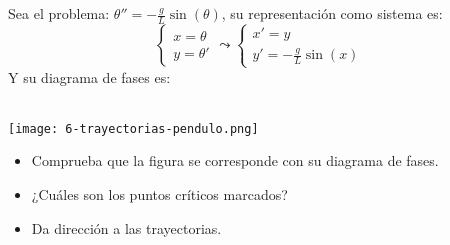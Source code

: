 \begin{th_ex}
    Sea el problema: $\theta '' = -\frac{g}{L} \sin(\theta)$, su representación como sistema es:
    $$
        \begin{cases}
            x = \theta\\
            y = \theta'
        \end{cases} \leadsto
        \begin{cases}
            x' = y\\
            y' = -\frac{g}{L}\sin(x)
        \end{cases}
    $$
    Y su diagrama de fases es:\\\\
    \begin{center}
        \texttt{[image: 6-trayectorias-pendulo.png]}
    \end{center}
    \begin{itemize}
        \item Comprueba que la figura se corresponde con su diagrama de fases.
        \item ¿Cuáles son los puntos críticos marcados?
        \item Da dirección a las trayectorias.
    \end{itemize}
\end{th_ex}
